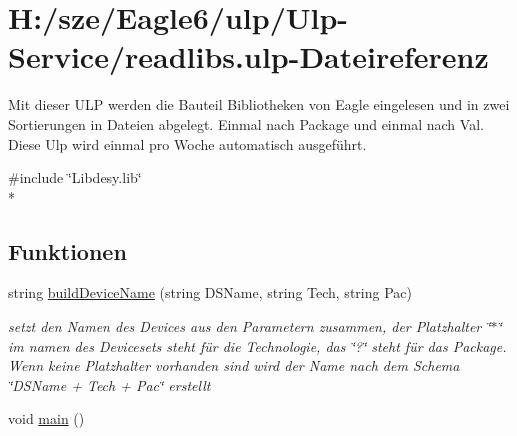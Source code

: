 \hypertarget{readlibs_8ulp}{}\section{H\+:/sze/\+Eagle6/ulp/\+Ulp-\/\+Service/readlibs.ulp-\/\+Dateireferenz}
\label{readlibs_8ulp}


Mit dieser U\+L\+P werden die Bauteil Bibliotheken von Eagle eingelesen und in zwei Sortierungen in Dateien abgelegt. Einmal nach Package und einmal nach Val. Diese Ulp wird einmal pro Woche automatisch ausgeführt.  


{\ttfamily \#include \char`\"{}Libdesy.\+lib\char`\"{}}\\*
\subsection*{Funktionen}
\begin{DoxyCompactItemize}
\item 
string \hyperlink{readlibs_8ulp_a4c66fd448cb78d435f0074a60df6e637}{build\+Device\+Name} (string D\+S\+Name, string Tech, string Pac)
\begin{DoxyCompactList}\small\item\em setzt den Namen des Devices aus den Parametern zusammen, der Platzhalter \char`\"{}$\ast$\char`\"{} im namen des Devicesets steht für die Technologie, das \char`\"{}?\char`\"{} steht für das Package. Wenn keine Platzhalter vorhanden sind wird der Name nach dem Schema \char`\"{}\+D\+S\+Name + Tech + Pac\char`\"{} erstellt \end{DoxyCompactList}\item 
void \hyperlink{readlibs_8ulp_acdef7a1fd863a6d3770c1268cb06add3}{main} ()
\end{DoxyCompactItemize}
